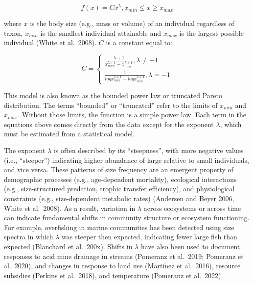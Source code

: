 \documentclass[
  12pt,
]{article}
\begin{document}
\[
f(x) = Cx^\lambda, x_{min} \le x \ge x_{max}
\]

where \(x\) is the body size (e.g., mass or volume) of an individual
regardless of taxon, \(x_{min}\) is the smallest individual attainable
and \(x_{max}\) is the largest possible individual (White et al.~2008).
\(C\) is a constant equal to:

\[
 C = \begin{cases}\frac{\lambda + 1}{{x_{max}^{\lambda+1}} - {x_{min}^{\lambda+1}}}, \lambda \neq-1 \\
\frac{1}{{logx_{max}^{\lambda+1}} - {logx_{min}^{\lambda+1}}}, \lambda = -1\end{cases}
\]

This model is also known as the bounded power law or truncated Pareto
distribution. The terms ``bounded'' or ``truncated'' refer to the limits
of \(x_{min}\) and \(x_{max}\). Without those limits, the function is a
simple power law. Each term in the equations above comes directly from
the data except for the exponent \(\lambda\), which must be estimated
from a statistical model.

The exponent \(\lambda\) is often described by its ``steepness'', with
more negative values (i.e., ``steeper'') indicating higher abundance of
large relative to small individuals, and vice versa. These patterns of
size frequency are an emergent property of demographic processes (e.g.,
age-dependent mortality), ecological interactions (e.g., size-structured
predation, trophic transfer efficiency), and physiological constraints
(e.g., size-dependent metabolic rates) (Andersen and Beyer 2006, White
et al.~2008). As a result, variation in \(\lambda\) across ecosystems or
across time can indicate fundamental shifts in community structure or
ecosystem functioning. For example, overfishing in marine communities
has been detected using size spectra in which \(\lambda\) was steeper
then expected, indicating fewer large fish than expected (Blanchard et
al.~200x). Shifts in \(\lambda\) have also been used to document
responses to acid mine drainage in streams (Pomeranz et al.~2019;
Pomeranz et al.~2020), and changes in response to land use (Martínez et
al.~2016), resource subsidies (Perkins et al.~2018), and temperature
(Pomeranz et al.~2022).
\end{document}
